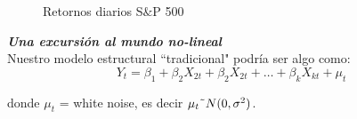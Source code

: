 
	
	\begin{figure}[H]
		\centering
		\textbf{}\par\medskip
		\caption{Retornos diarios S$\&$P 500}\label{fig5_2}
	\end{figure}
	

	\textit{\textbf{Una excursi\'on al mundo no-lineal}}\\
	
	Nuestro modelo estructural ``tradicional" podr\'{i}a ser algo como:\\
	
	\begin{equation}
	Y_t = \beta_1 + \beta_2 X_{2t} + \beta_2 X_{2t} + \dots{} + \beta_k X_{kt} +\mu_t 
	\end{equation}
	
	donde $\mu_t$ = white noise, es decir $\mu_t \string~N(0,\sigma^2)$.\\
	\vspace{4mm}	
	
